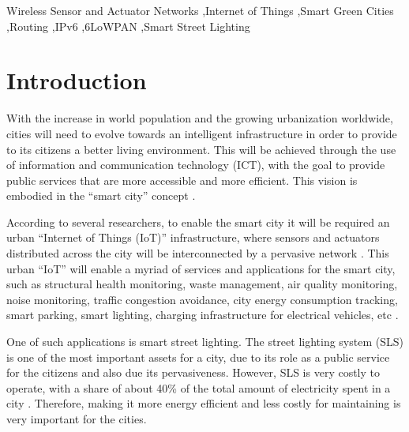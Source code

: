 \documentclass[final,authoryear,3p,twocolumn]{elsarticle}
\begin{document}
\begin{frontmatter}
\begin{keyword}
Wireless Sensor and Actuator Networks  \sep Internet of Things \sep Smart Green Cities \sep Routing \sep IPv6 \sep 6LoWPAN \sep Smart Street Lighting



\end{keyword}

\end{frontmatter}


\section{Introduction}

With  the increase in world population and the growing urbanization worldwide, cities will need to evolve towards an intelligent infrastructure in order to provide to its citizens a better living environment. This will be achieved through the use of information and communication technology (ICT), with the goal to provide public services that are more accessible and more efficient. This vision is embodied in the ``smart city'' concept \citep{Smart_City_2011, Smart_City_2013}. 

According to several researchers, to enable the smart city it will be required an urban ``Internet of Things (IoT)'' infrastructure, where sensors and actuators distributed across the city will be interconnected by a pervasive network \citep{Smart_City_IOT_2014,Smart_City_IOT_2014b}. 
This urban ``IoT'' will enable a myriad of services and applications for the smart city, such as structural health monitoring, waste management, air quality monitoring, noise monitoring, traffic congestion avoidance, city energy consumption tracking, smart parking, smart lighting, charging infrastructure for electrical vehicles, etc \citep{Smart_City_2011, Smart_City_2013}.

One of such applications is smart street lighting. The street lighting system (SLS) is one of the most important assets for a city, due to its role as a public service for the citizens and also due its pervasiveness. However, SLS is very costly to operate, with a share of about 40\% of the total amount of electricity spent in a city \citep{Smart_City_Smart_Light_2013}. Therefore, making it more energy efficient and less costly for maintaining is very important for the cities.
\end{document}
